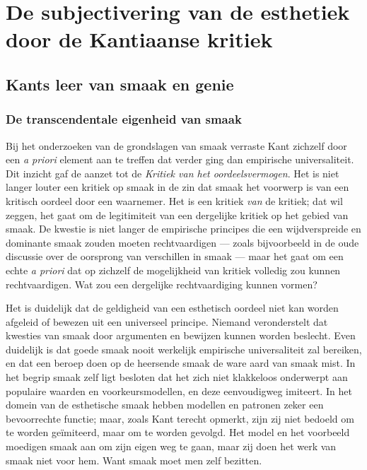 \section{De subjectivering van de esthetiek door de Kantiaanse kritiek}

\subsection{Kants leer van smaak en genie}

\subsubsection{De transcendentale eigenheid van smaak}

Bij het onderzoeken van de grondslagen van smaak verraste Kant zichzelf door een \textit{a priori} element aan te treffen dat verder ging dan empirische universaliteit. Dit inzicht gaf de aanzet tot de \textit{Kritiek van het oordeelsvermogen}. Het is niet langer louter een kritiek op smaak in de zin dat smaak het voorwerp is van een kritisch oordeel door een waarnemer. Het is een kritiek \textit{van} de kritiek; dat wil zeggen, het gaat om de legitimiteit van een dergelijke kritiek op het gebied van smaak. De kwestie is niet langer de empirische principes die een wijdverspreide en dominante smaak zouden moeten rechtvaardigen — zoals bijvoorbeeld in de oude discussie over de oorsprong van verschillen in smaak — maar het gaat om een echte \textit{a priori} dat op zichzelf de mogelijkheid van kritiek volledig zou kunnen rechtvaardigen. Wat zou een dergelijke rechtvaardiging kunnen vormen?

Het is duidelijk dat de geldigheid van een esthetisch oordeel niet kan worden afgeleid of bewezen uit een universeel principe. Niemand veronderstelt dat kwesties van smaak door argumenten en bewijzen kunnen worden beslecht. Even duidelijk is dat goede smaak nooit werkelijk empirische universaliteit zal bereiken, en dat een beroep doen op de heersende smaak de ware aard van smaak mist. In het begrip smaak zelf ligt besloten dat het zich niet klakkeloos onderwerpt aan populaire waarden en voorkeursmodellen, en deze eenvoudigweg imiteert. In het domein van de esthetische smaak hebben modellen en patronen zeker een bevoorrechte functie; maar, zoals Kant terecht opmerkt, zijn zij niet bedoeld om te worden geïmiteerd, maar om te worden gevolgd. Het model en het voorbeeld moedigen smaak aan om zijn eigen weg te gaan, maar zij doen het werk van smaak niet voor hem. Want smaak moet men zelf bezitten.

